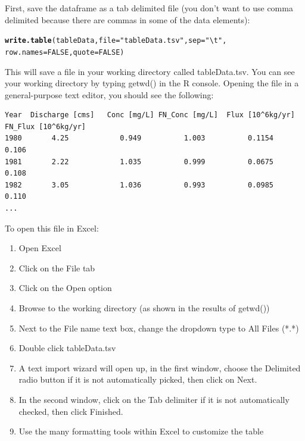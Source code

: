 \documentclass[a4paper,11pt]{article}\usepackage[]{graphicx}\usepackage[]{color}
\makeatletter
\newcommand{\hlnum}[1]{\textcolor[rgb]{0.686,0.059,0.569}{#1}}%
\newcommand{\hlstr}[1]{\textcolor[rgb]{0.192,0.494,0.8}{#1}}%
\newcommand{\hlstd}[1]{\textcolor[rgb]{0.345,0.345,0.345}{#1}}%
\newcommand{\hlkwc}[1]{\textcolor[rgb]{0.333,0.667,0.333}{#1}}%
\newcommand{\hlkwd}[1]{\textcolor[rgb]{0.737,0.353,0.396}{\textbf{#1}}}%
\newenvironment{kframe}{%
 \def\at@end@of@kframe{}%
 \ifinner\ifhmode%
  \def\at@end@of@kframe{\end{minipage}}%
  \begin{minipage}{\columnwidth}%
 \fi\fi%
 \def\FrameCommand##1{\hskip\@totalleftmargin \hskip-\fboxsep
 \colorbox{shadecolor}{##1}\hskip-\fboxsep
     \hskip-\linewidth \hskip-\@totalleftmargin \hskip\columnwidth}%
 \MakeFramed {\advance\hsize-\width
   \@totalleftmargin\z@ \linewidth\hsize
   \@setminipage}}%
 {\par\unskip\endMakeFramed%
 \at@end@of@kframe}
\newenvironment{knitrout}{}{} %
\makeatother
\begin{document}
First, save the dataframe as a tab delimited file (you don't want to use comma delimited because there are commas in some of the data elements):


\begin{knitrout}
\color{fgcolor}\begin{kframe}
\begin{alltt}
\hlkwd{write.table}\hlstd{(tableData,} \hlkwc{file}\hlstd{=}\hlstr{"tableData.tsv"}\hlstd{,}\hlkwc{sep}\hlstd{=}\hlstr{"\textbackslash{}t"}\hlstd{,}
            \hlkwc{row.names} \hlstd{=} \hlnum{FALSE}\hlstd{,}\hlkwc{quote}\hlstd{=}\hlnum{FALSE}\hlstd{)}
\end{alltt}
\end{kframe}
\end{knitrout}

This will save a file in your working directory called tableData.tsv.  You can see your working directory by typing getwd() in the R console. Opening the file in a general-purpose text editor, you should see the following:

\begingroup
    \fontsize{8pt}{10pt}
\begin{verbatim}
Year  Discharge [cms]	Conc [mg/L]	FN_Conc [mg/L]	Flux [10^6kg/yr]	FN_Flux [10^6kg/yr]
1980	   4.25	           0.949	      1.003	         0.1154	            0.106  
1981	   2.22	           1.035	      0.999	         0.0675	            0.108 
1982	   3.05	           1.036	      0.993	         0.0985	            0.110 
...
\end{verbatim}
\endgroup

To open this file in Excel:
\begin{enumerate}
\item Open Excel
\item Click on the File tab
\item Click on the Open option
\item Browse to the working directory (as shown in the results of getwd())
\item Next to the File name text box, change the dropdown type to All Files (*.*)
\item Double click tableData.tsv
\item A text import wizard will open up, in the first window, choose the Delimited radio button if it is not automatically picked, then click on Next.
\item In the second window, click on the Tab delimiter if it is not automatically checked, then click Finished.
\item Use the many formatting tools within Excel to customize the table
\end{enumerate}
\end{document}
